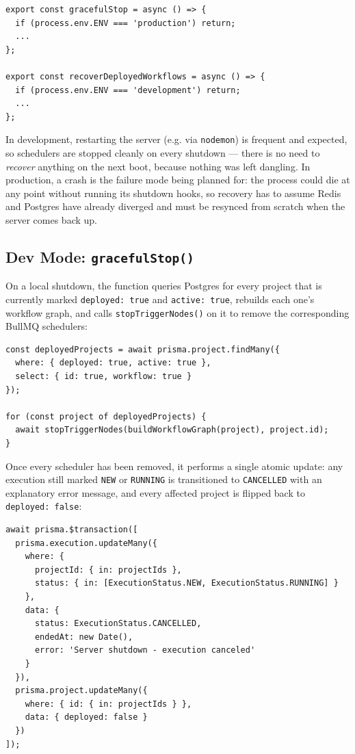 \begin{lstlisting}
export const gracefulStop = async () => {
  if (process.env.ENV === 'production') return;
  ...
};

export const recoverDeployedWorkflows = async () => {
  if (process.env.ENV === 'development') return;
  ...
};
\end{lstlisting}

In development, restarting the server (e.g. via \texttt{nodemon}) is frequent and expected, so schedulers are stopped cleanly on every 
shutdown — there is no need to \emph{recover} anything on the next boot, because nothing was left dangling. In production, a crash is the 
failure mode being planned for: the process could die at any point without running its shutdown hooks, so recovery has to assume Redis and 
Postgres have already diverged and must be resynced from scratch when the server comes back up.

\subsection{Dev Mode: \texttt{gracefulStop()}}

On a local shutdown, the function queries Postgres for every project that is currently marked \texttt{deployed: true} and 
\texttt{active: true}, rebuilds each one's workflow graph, and calls \texttt{stopTriggerNodes()} on it to remove the corresponding BullMQ 
schedulers:

\begin{lstlisting}
const deployedProjects = await prisma.project.findMany({
  where: { deployed: true, active: true },
  select: { id: true, workflow: true }
});

for (const project of deployedProjects) {
  await stopTriggerNodes(buildWorkflowGraph(project), project.id);
}
\end{lstlisting}

Once every scheduler has been removed, it performs a single atomic update: any execution still marked \texttt{NEW} or \texttt{RUNNING} is 
transitioned to \texttt{CANCELLED} with an explanatory error message, and every affected project is flipped back to \texttt{deployed: false}:

\begin{lstlisting}
await prisma.$transaction([
  prisma.execution.updateMany({
    where: {
      projectId: { in: projectIds },
      status: { in: [ExecutionStatus.NEW, ExecutionStatus.RUNNING] }
    },
    data: {
      status: ExecutionStatus.CANCELLED,
      endedAt: new Date(),
      error: 'Server shutdown - execution canceled'
    }
  }),
  prisma.project.updateMany({
    where: { id: { in: projectIds } },
    data: { deployed: false }
  })
]);
\end{lstlisting}

